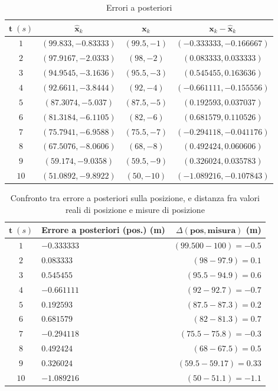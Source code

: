 \begin{table}[h]
	\begin{tabular}{|c|c|c|c|}
		\hline 
		$\mathbf{t}\;(s)$ & $\mathbf{\hat{x}}_k$ & $\mathbf x_k$ & $\mathbf x_k - \mathbf{\hat{x}}_k$ \\ 
		\hline 
		$1$&$(99.833,-0.83333)$&$(99.5,-1)$  & $(-0.333333,-0.166667)$
		   \\ 
		\hline 
		$2$&$(97.9167,-2.0333)$ & $(98,-2)$ & $(0.083333,0.033333)$
		
		   \\ 
		\hline 
		$3$& $(94.9545,-3.1636)$ & $(95.5,-3)$ & $(0.545455,0.163636)$
		
		  \\ 
		\hline 
		$4$&  $(92.6611,-3.8444)$ & $(92,-4)$ &$(-0.661111,-0.155556)$
		
		  \\ 
		\hline 
		$5$&$(87.3074,-5.037)$  & $(87.5,-5)$ &  $(0.192593,0.037037)$
		  \\ 
		\hline 
		$6$& $(81.3184,-6.1105)$ & $(82,-6)$ &  $(0.681579,0.110526)$
		  \\ 
		\hline 
		$7$&  $(75.7941,-6.9588)$ & $(75.5,-7)$ &  $(-0.294118,-0.041176)$
		  \\ 
		\hline 
		$8$& $(67.5076,-8.0606)$ & $(68,-8)$ &  $(0.492424,0.060606)$
		  \\ 
		\hline 
		$9$&  $(59.174,-9.0358)$ & $(59.5,-9)$ &  $(0.326024,0.035783)$
		  \\ 
		\hline 
		$10$& $(51.0892,-9.8922)$ & $(50,-10)$ & $(-1.089216,-0.107843)$
		  \\ 
		\hline 
	\end{tabular} 
	\caption{Errori a posteriori}
	\label{tab:errors}
\end{table}
\begin{table}[h]
	\begin{tabular}{|c|l|r|}
		\hline 
		$\mathbf{t}\;(s)$ & \textbf{Errore a posteriori (pos.) (m)} & $\Delta \mathbf{(pos,misura)}$ \textbf{(m)} \\ 
		\hline 
		$1$ & $-0.333333$ & $(99.500 - 100) =-0.5$ \\ 
		\hline 
		$2$ & $0.083333$ & $(98 - 97.9) = 0.1$ \\ 
		\hline 
		$3$ & $0.545455$ & $(95.5-94.9) = 0.6$ \\ 
		\hline 
		$4$ & $-0.661111$ & $(92 - 92.7) = -0.7$ \\ 
		\hline 
		$5$ &  $0.192593$ & $(87.5 - 87.3) = 0.2$ \\ 
		\hline 
		$6$ & $0.681579$ & $(82 - 81.3) = 0.7$ \\ 
		\hline 
		$7$ & $-0.294118$ & $(75.5 - 75.8) = -0.3$ \\ 
		\hline 
		$8$ & $0.492424$ & $(68 - 67.5) = 0.5$ \\ 
		\hline 
		$9$ & $0.326024$ & $(59.5 - 59.17) = 0.33$ \\ 
		\hline 
		$10$ & $-1.089216$ & $(50-51.1) = -1.1$ \\ 
		\hline 
	\end{tabular} 
	\caption{Confronto tra errore a posteriori sulla posizione, e distanza fra valori reali di posizione e misure di posizione}
	\label{tab:errorsmeas}
\end{table}
